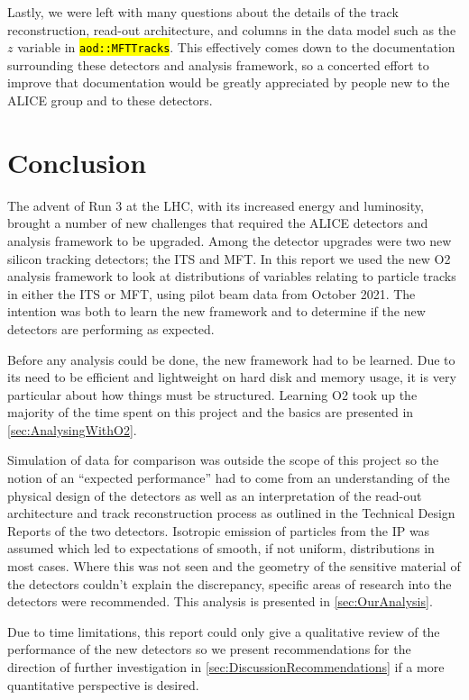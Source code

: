 \documentclass[11pt]{article}
\numberwithin{equation}{section}
\numberwithin{figure}{section}
\numberwithin{table}{section}
\let\OldTexttt\texttt
\renewcommand{\texttt}[1]{\OldTexttt{\hl{#1}}}
\begin{document}
Lastly, we were left with many questions about the details of the track reconstruction, read-out architecture, and columns in the data model such as the $z$ variable in \texttt{aod::MFTTracks}. This effectively comes down to the documentation surrounding these detectors and analysis framework, so a concerted effort to improve that documentation would be greatly appreciated by people new to the ALICE group and to these detectors. 

\section{Conclusion}\label{sec:Conclusion}
The advent of Run 3 at the LHC, with its increased energy and luminosity, brought a number of new challenges that required the ALICE detectors and analysis framework to be upgraded. Among the detector upgrades were two new silicon tracking detectors; the ITS and MFT. In this report we used the new O2 analysis framework to look at distributions of variables relating to particle tracks in either the ITS or MFT, using pilot beam data from October 2021. The intention was both to learn the new framework and to determine if the new detectors are performing as expected.

Before any analysis could be done, the new framework had to be learned. Due to its need to be efficient and lightweight on hard disk and memory usage, it is very particular about how things must be structured. Learning O2 took up the majority of the time spent on this project and the basics are presented in \cref{sec:AnalysingWithO2}. 

Simulation of data for comparison was outside the scope of this project so the notion of an ``expected performance'' had to come from an understanding of the physical design of the detectors as well as an interpretation of the read-out architecture and track reconstruction process as outlined in the Technical Design Reports of the two detectors. Isotropic emission of particles from the IP was assumed which led to expectations of smooth, if not uniform, distributions in most cases. Where this was not seen and the geometry of the sensitive material of the detectors couldn't explain the discrepancy, specific areas of research into the detectors were recommended. This analysis is presented in \cref{sec:OurAnalysis}.

Due to time limitations, this report could only give a qualitative review of the performance of the new detectors so we present recommendations for the direction of further investigation in \cref{sec:DiscussionRecommendations} if a more quantitative perspective is desired.
\end{document}
